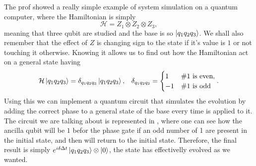 {
    The prof showed a really simple example of system simulation on a quantum computer, where the Hamiltonian is simply 
    \begin{equation}
        \mathcal{H} = Z_1\otimes Z_2\otimes Z_3,
    \end{equation}
    meaning that three qubit are studied and the base is so $\ket{q_1q_2q_3}$. We shall also remember that the effect of $Z$ is changing sign to the state if it's value is $1$ or not touching it otherwise. Knowing it allows us to find out how the Hamiltonian act on a general state having
    \begin{align}
        &\mathcal{H}\ket{q_1q_2q_3} = \delta_{q_1q_2q_3}\ket{q_1q_2q_3}, &\delta_{q_1q_2q_3} = \begin{cases}
            1 & \#1\text{ is even},\\
            -1 & \#1\text{ is odd}
        \end{cases}.
    \end{align}
    Using this we can implement a quantum circuit that simulates the evolution by adding the correct phase to a general state of the base every time is applied to it. The circuit we are talking about is represented in , where one can see how the ancilla qubit will be $1$ befor the phase gate if an odd number of 1 are present in the initial state, and then will return to the initial state. Therefore, the final result is simply $e^{i\delta\Delta t}\ket{q_1q_2q_3}\otimes\ket{0}$, the state has effectivelly evolved as we wanted.
}